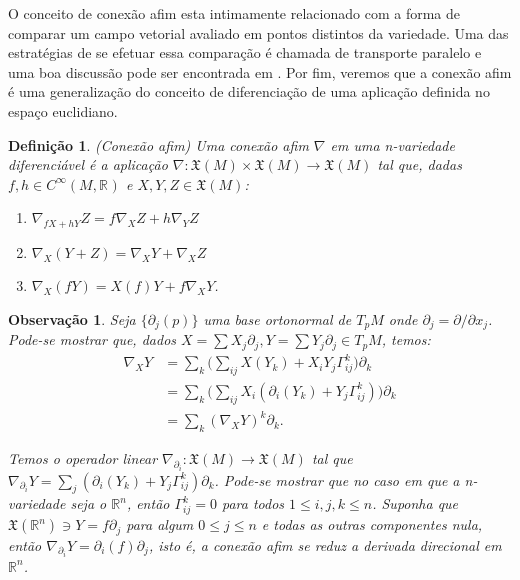 \documentclass[12pt]{book}
\newtheorem{definicao}[teorema]{Definição}
\newtheorem{observacao}[teorema]{Observação}
\newcommand{\campossuaves}[1]{\mathfrak{X}(#1)}
\newcommand{\funcoessuaves}[1]{C^{\infty}(#1, \real{})}
\newcommand{\real}[1]{\mathbb{R}^{#1}}
\begin{document}
	O conceito de conexão afim esta intimamente relacionado com a forma de comparar um campo vetorial avaliado em pontos distintos da variedade. Uma das estratégias de se efetuar essa comparação é chamada de transporte paralelo e uma boa discussão pode ser encontrada em \cite{nakahara}. Por fim, veremos que a conexão afim é uma generalização do conceito de diferenciação de uma aplicação definida no espaço euclidiano.
	
	\begin{definicao}
		(Conexão afim) Uma conexão afim $\nabla$ em uma n-variedade diferenciável é a aplicação $\nabla: \campossuaves{M} \times \campossuaves{M} \to \campossuaves{M}$ tal que, dadas $f,h \in \funcoessuaves{M}$ e $X,Y,Z \in \campossuaves{M}$:
		\begin{enumerate}
			\item $\nabla_{fX+hY}Z = f\nabla_{X}Z+h\nabla_{Y}Z$
			\item $\nabla_{X}(Y+Z) = \nabla_{X}Y+ \nabla_{X}Z$
			\item $\nabla_{X}(fY) = X(f)Y+f\nabla_{X}Y$.
		\end{enumerate}
	\end{definicao}
	
	\begin{observacao}\label{observacao_conexao_afim}
		Seja $\{\partial_{j}(p)\}$ uma base ortonormal de $T_{p}M$ onde $\partial_{j} = \partial/\partial x_{j}$. Pode-se mostrar que, dados $X=\sum X_{j}\partial_{j}, Y=\sum Y_{j}\partial_{j} \in T_{p}M$, temos:
		$$
		\begin{aligned}
		\nabla_{X}Y &= 
		\sum_{k} \Big( \sum_{ij} X(Y_{k}) + X_{i}Y_{j} \Gamma^{k}_{ij}\Big)\partial_{k} 
		\\
		&= 
		\sum_{k} \Big( \sum_{ij} X_{i} (\partial_{i}(Y_{k}) + Y_{j} \Gamma^{k}_{ij})\Big)\partial_{k} 
		\\
		&= \sum_{k} (\nabla_{X}Y)^{k}\partial_{k}.
		\end{aligned} 
		$$
		
		Temos o operador linear $\nabla_{\partial_{i}}: \campossuaves{M} \to \campossuaves{M}$ tal que $\nabla_{\partial_{i}}Y = \sum_{j}  (\partial_{i}(Y_{k}) + Y_{j} \Gamma^{k}_{ij})\partial_{k} $. Pode-se mostrar que no caso em que a n-variedade seja o $\real{n}$, então $\Gamma_{ij}^{k}=0$ para todos $1\leq i,j,k \leq n$. Suponha que $\campossuaves{\real{n}} \ni Y = f\partial_{j}$ para algum $0 \leq j \leq n$ e todas as outras componentes nula, então $\nabla_{\partial_{i}}Y = \partial_{i}(f)\partial_{j} $, isto é, a conexão afim se reduz a derivada direcional em $\real{n}$.
	\end{observacao}
	
\end{document}
